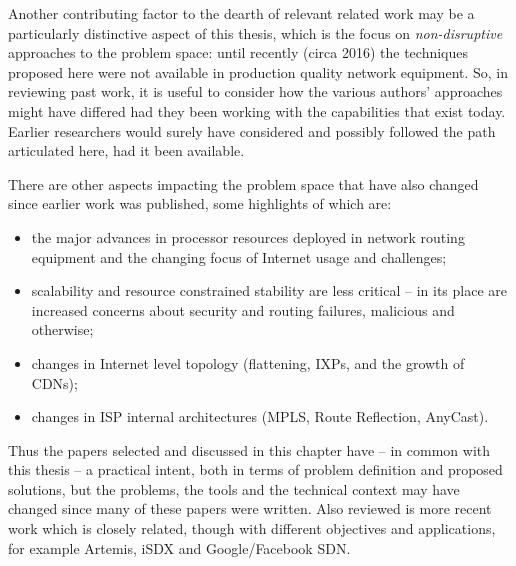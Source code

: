 
Another contributing factor to the dearth of relevant related work may be a particularly distinctive aspect of this thesis, which is the focus on \emph{non-disruptive} approaches to the problem space:
until recently (circa 2016) the techniques proposed here were not available in production quality network equipment.
So, in reviewing past work, it is useful to consider how the various authors' approaches might have differed had they been working with the capabilities that exist today.
Earlier researchers would surely have considered and possibly followed the path articulated here, had it been available.


There are other aspects impacting the problem space that have also changed since earlier work was published, some highlights of which are:
\begin{itemize}[noitemsep,nolistsep]
	\item{the major advances in processor resources deployed in network routing equipment and the changing focus of Internet usage and challenges;}
	\item{scalability and resource constrained stability are less critical -- in its place are increased concerns about security and routing failures, malicious and otherwise;}
	\item{changes in Internet level topology (flattening, IXPs, and the growth of CDNs);}
	\item{changes in ISP internal architectures (MPLS, Route Reflection, AnyCast).}
\end{itemize}

Thus the papers selected and discussed in this chapter have -- in common with this thesis -- a practical intent, both in terms of problem definition and proposed solutions, but the problems, the tools and the technical context may have changed since many of these papers were written.
Also reviewed is more recent work which is closely related, though with different objectives and applications, for example Artemis, iSDX and Google/Facebook SDN.

